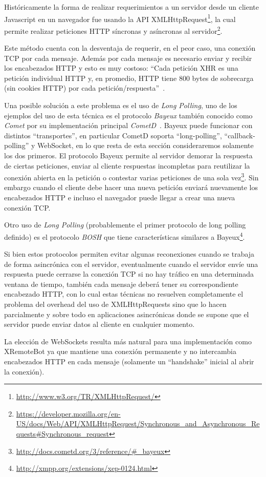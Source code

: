 Históricamente la forma de realizar requerimientos a un servidor desde un
cliente Javascript en un navegador fue usando la API
XMLHttpRequest\footnote{\url{http://www.w3.org/TR/XMLHttpRequest/}}, la
cual permite realizar peticiones HTTP síncronas y asíncronas al
servidor\footnote{\url{https://developer.mozilla.org/en-US/docs/Web/API/XMLHttpRequest/Synchronous_and_Asynchronous_Requests\#Synchronous_request}}.

Este método cuenta con la desventaja de requerir, en el peor caso, una conexión
TCP por cada mensaje. Además por cada mensaje es necesario
enviar y recibir los encabezados HTTP y esto es muy costoso:
``Cada petición XHR es una petición individual HTTP y, en promedio, HTTP
tiene 800 bytes de sobrecarga (sin cookies HTTP) por cada
petición/respuesta''~\citep{grigorik_2013}.

Una posible solución a este problema es el uso de \textit{Long Polling},
uno de los ejemplos del uso de esta técnica es el protocolo \textit{Bayeux}
también conocido como \textit{Comet} por
su implementación principal
\textit{CometD}~\citep{roden_2010}. Bayeux puede funcionar con distintos
``transportes'', en particular CometD soporta ``long-polling'',
``callback-polling'' y WebSocket, en lo que resta de esta sección
consideraremos solamente los dos primeros.
El protocolo Bayeux permite al servidor demorar la respuesta
de ciertas peticiones, enviar al cliente respuestas incompletas para reutilizar
la conexión abierta en la petición o contestar varias peticiones de
una sola vez\footnote{\url{http://docs.cometd.org/3/reference/\#_bayeux}}.
Sin embargo cuando el cliente debe hacer una nueva petición enviará
nuevamente los encabezados HTTP e incluso el navegador puede llegar a
crear una nueva conexión TCP.

Otro uso de \textit{Long Polling} (probablemente el primer protocolo
de long polling definido) es el protocolo \textit{BOSH} que tiene
características similares a
Bayeux\footnote{\url{http://xmpp.org/extensions/xep-0124.html}}.

Si bien estos protocolos permiten evitar algunas reconexiones cuando
se trabaja de forma asincrónica con el servidor, eventualmente cuando el
servidor envíe una respuesta puede cerrarse la conexión TCP
si no hay tráfico en una determinada ventana de tiempo,
también cada mensaje
deberá tener su correspondiente encabezado HTTP, con lo cual
estas técnicas no resuelven completamente el problema del overhead del
uso de XMLHttpRequests sino que lo hacen parcialmente y sobre todo
en aplicaciones asincrónicas donde se supone que el servidor puede enviar
datos al cliente en cualquier momento.

La elección de WebSockets resulta más natural para una implementación
como XRemoteBot ya que mantiene una conexión permanente y no intercambia
encabezados HTTP en cada mensaje (solamente un ``handshake'' inicial
al abrir la conexión).

